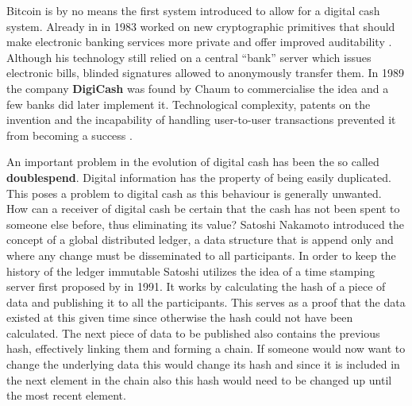 \documentclass[final]{fhnwreport}       %
\begin{document}
Bitcoin is by no means the first system introduced to allow for a digital cash system. Already in in 1983 \citeauthor{chaum_blind_1983} worked on new cryptographic primitives that should make electronic banking services more private and offer improved auditability \citep{chaum_blind_1983}. Although his technology still relied on a central ``bank'' server which issues electronic bills, blinded signatures allowed to anonymously transfer them. In 1989 the company \textbf{DigiCash} was found by Chaum to commercialise the idea and a few banks did later implement it. Technological complexity, patents on the invention and the incapability of handling  user-to-user transactions prevented it from becoming a success \cite{narayanan_bitcoin_2016}. 

An important problem in the evolution of digital cash has been the so called \textbf{\gls{doublespend}}. Digital information has the property of being easily duplicated. This poses a problem to digital cash as this behaviour is generally unwanted. How can a receiver of digital cash be certain that the cash has not been spent to someone else before, thus eliminating its value? Satoshi Nakamoto introduced the concept of a global distributed ledger, a data structure that is append only and where any change must be disseminated to all participants. In order to keep the history of the ledger immutable Satoshi utilizes the idea of a time stamping server first proposed by \textcite{haber_how_1991} in 1991. It works by calculating the hash of a piece of data and publishing it to all the participants. This serves as a proof that the data existed at this given time since otherwise the hash could not have been calculated. The next piece of data to be published also contains the previous hash, effectively linking them and forming a chain. If someone would now want to change the underlying data this would change its hash and since it is included in the next element in the chain also this hash would need to be changed up until the most recent element. 
\end{document}
